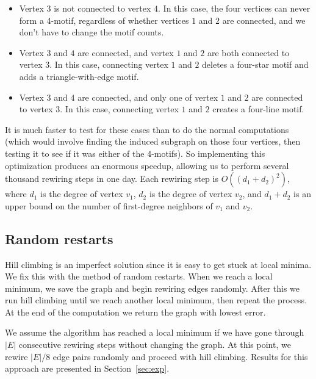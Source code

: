 \begin{itemize}
\item Vertex $3$ is not connected to vertex $4$.  In this case, the four vertices can never form a 4-motif, regardless of whether vertices $1$ and $2$ are connected, and we don't have to change the motif counts.
\item Vertex $3$ and $4$ are connected, and vertex $1$ and $2$ are both connected to vertex $3$.  In this case, connecting vertex $1$ and $2$ deletes a four-star motif and adds a triangle-with-edge motif.
\item Vertex $3$ and $4$ are connected, and only one of vertex $1$ and $2$ are connected to vertex $3$.  In this case, connecting vertex $1$ and $2$ creates a four-line motif.
\end{itemize}

It is much faster to test for these cases than to do the normal
computations (which would involve finding the induced subgraph on those
four vertices, then testing it to see if it was either of the 4-motifs).
So implementing this optimization produces an enormous speedup, allowing us
to perform several thousand rewiring steps in one day.  Each rewiring step
is $O((d_1 + d_2)^2)$, where $d_1$ is the degree of vertex $v_1$, $d_2$
is the degree of vertex $v_2$, and $d_1 + d_2$ is an upper bound on the 
number of first-degree neighbors of $v_1$ and $v_2$.

\subsection{Random restarts}

Hill climbing is an imperfect solution since it is easy to get stuck at
local minima.  We fix this with the method of random restarts.  When we
reach a local minimum, we save the graph and begin rewiring edges randomly.
After this we run hill climbing until we reach another local minimum, then 
repeat the process.  At the end of the computation we return the graph with
lowest error.

We assume the algorithm has reached a local minimum if we have gone through
$|E|$ consecutive rewiring steps without changing the graph.  At this
point, we rewire $|E|/8$ edge pairs randomly and proceed with hill
climbing.  Results for this approach are presented in Section~\ref{sec:exp}.
